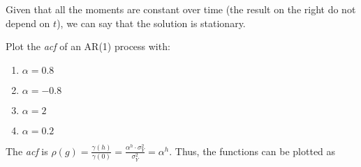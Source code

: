         Given that all the moments are constant over time (the result on the right do not depend on \(t\)), we can say that the solution is stationary.

        \begin{example}[Do it yourself!]
            Plot the \textit{acf} of an AR(1) process with:
            \begin{enumerate}
                \item \(\alpha = 0.8\)
                \item \(\alpha = -0.8\)
                \item \(\alpha = 2\)
                \item \(\alpha = 0.2\)
            \end{enumerate}
        \end{example}

            The \textit{acf} is \(\rho(g) = \frac{\gamma(h)}{\gamma(0)} = \frac{\alpha^h \cdot \sigma^2_Y}{\sigma^2_Y} = \alpha^h\).
            Thus, the functions can be plotted as

